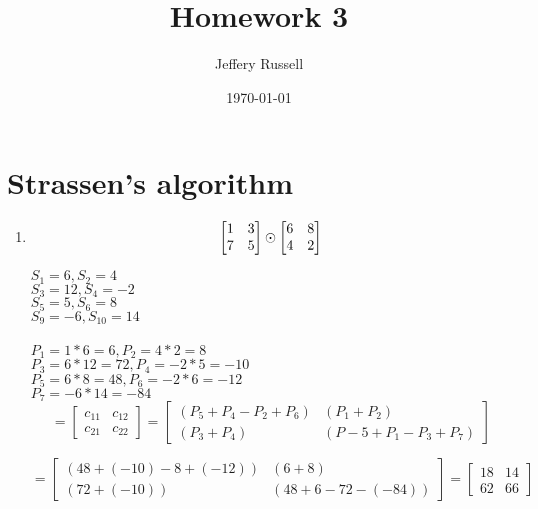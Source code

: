 \documentclass[12pt]{article}%
\begin{document}
\title{Homework 3}
\author{Jeffery Russell}
\date{\today}
\maketitle

\section{Strassen's algorithm}



\begin{enumerate}[label=(\alph*)]

\item 

$$
\begin{bmatrix}
1 & 3\\
7 & 5
\end{bmatrix} \odot
\begin{bmatrix}
6 & 8\\
4 & 2
\end{bmatrix}\\*
$$

$S_1 = 6, S_2 = 4$\\
$S_3 = 12, S_4 = -2$\\
$S_5 = 5, S_6 = 8$\\
$S_9 = -6, S_{10} = 14$\\
\\
$P_1 = 1*6 = 6, P_2 = 4*2 = 8$\\
$P_3 = 6*12 = 72, P_4 = -2*5 = -10$\\
$P_5 = 6*8 = 48, P_6 = -2*6 = -12$\\
$P_7 = -6*14 = -84$\\

$$
= 
\begin{bmatrix}
c_{11} & c_{12}\\
c_{21} & c_{22}
\end{bmatrix} = 
\begin{bmatrix}
(P_5 + P_4 - P_2 + P_6) & (P_1+P_2)\\
(P_3+P_4) & (P-5+P_1 - P_3 + P_7)
\end{bmatrix} 
$$

$$
= 
\begin{bmatrix}
(48 + (-10) - 8 + (-12)) & (6 + 8)\\
(72 + (-10)) & (48 + 6 - 72 - (-84))
\end{bmatrix} = 
\begin{bmatrix}
18 & 14\\
62 & 66
\end{bmatrix}
$$



\end{enumerate}
\end{document}
